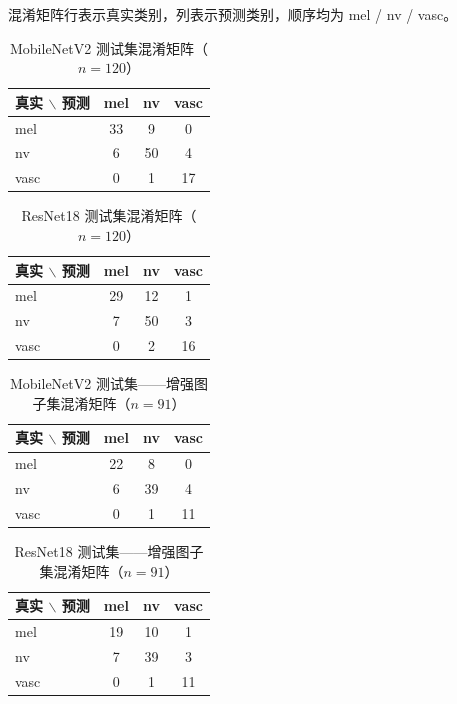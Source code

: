 \documentclass[12pt,a4paper]{ctexart}
\begin{document}
混淆矩阵行表示真实类别，列表示预测类别，顺序均为 mel / nv / vasc。

\begin{table}[H]
  \centering
  \caption{MobileNetV2 测试集混淆矩阵（$n=120$）}
  \label{tab:cm_mb_test}
  \begin{tabular}{l|ccc}
    \toprule
    真实 $\backslash$ 预测 & mel & nv & vasc \\
    \midrule
    mel  & 33 & 9  & 0 \\
    nv   & 6  & 50 & 4 \\
    vasc & 0  & 1  & 17 \\
    \bottomrule
  \end{tabular}
\end{table}

\begin{table}[H]
  \centering
  \caption{ResNet18 测试集混淆矩阵（$n=120$）}
  \label{tab:cm_rn_test}
  \begin{tabular}{l|ccc}
    \toprule
    真实 $\backslash$ 预测 & mel & nv & vasc \\
    \midrule
    mel  & 29 & 12 & 1 \\
    nv   & 7  & 50 & 3 \\
    vasc & 0  & 2  & 16 \\
    \bottomrule
  \end{tabular}
\end{table}

\begin{table}[H]
  \centering
  \caption{MobileNetV2 测试集——增强图子集混淆矩阵（$n=91$）}
  \label{tab:cm_mb_aug}
  \begin{tabular}{l|ccc}
    \toprule
    真实 $\backslash$ 预测 & mel & nv & vasc \\
    \midrule
    mel  & 22 & 8  & 0 \\
    nv   & 6  & 39 & 4 \\
    vasc & 0  & 1  & 11 \\
    \bottomrule
  \end{tabular}
\end{table}

\begin{table}[H]
  \centering
  \caption{ResNet18 测试集——增强图子集混淆矩阵（$n=91$）}
  \label{tab:cm_rn_aug}
  \begin{tabular}{l|ccc}
    \toprule
    真实 $\backslash$ 预测 & mel & nv & vasc \\
    \midrule
    mel  & 19 & 10 & 1 \\
    nv   & 7  & 39 & 3 \\
    vasc & 0  & 1  & 11 \\
    \bottomrule
  \end{tabular}
\end{table}
\end{document}
